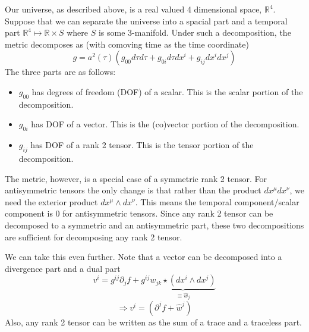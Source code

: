 Our universe, as described above, is a real valued 4 dimensional space, $\mathbb{R}^4$. Suppose that we can separate the universe into a spacial part and a temporal part $\mathbb{R}^4 \mapsto \mathbb{R} \times S$ where $S$ is some $3$-manifold. Under such a decomposition, the metric decomposes as (with comoving time as the time coordinate)
\[ g = a^2(\tau)\left( g_{00}d\tau d\tau + g_{0i}d\tau dx^{i} + g_{ij} dx^{i}dx^{j} \right) \]
The three parts are as follows:
\begin{itemize}
    \item $g_{00}$ has degrees of freedom (DOF) of a scalar. This is the scalar portion of the decomposition.
    \item $g_{0i}$ has DOF of a vector. This is the (co)vector portion of the decomposition.
    \item $g_{ij}$ has DOF of a rank 2 tensor. This is the tensor portion of the decomposition.
\end{itemize}
The metric, however, is a special case of a symmetric rank 2 tensor. For antisymmetric tensors the only change is that rather than the product $dx^\mu dx^\nu$, we need the exterior product $dx^\mu \wedge dx^\nu$. This means the temporal component/scalar component is 0 for antisymmetric tensors. Since any rank 2 tensor can be decomposed to a symmetric and an antisymmetric part, these two decompositions are sufficient for decomposing any rank 2 tensor. 

We can take this even further. Note that a vector can be decomposed into a divergence part and a dual part
\[ v^i = g^{ij}\partial_j f + g^{ij} \underbrace{w_{jk}\star (dx^{i} \wedge dx^{j})}_{\equiv \hat{w}_j} \]
\[ \Rightarrow v^i = (\partial^j f + \hat{w}^j) \]
Also, any rank 2 tensor can be written as the sum of a trace and a traceless part.